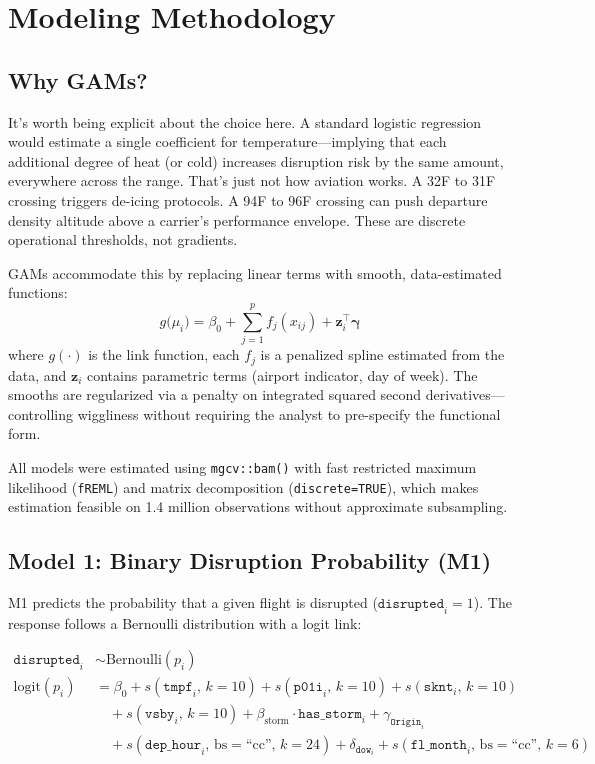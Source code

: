 \documentclass[12pt, a4paper]{article}
\begin{document}
\section{Modeling Methodology}
\label{sec:methods}

\subsection{Why GAMs?}

It's worth being explicit about the choice here. A standard logistic regression would estimate a single coefficient for temperature---implying that each additional degree of heat (or cold) increases disruption risk by the same amount, everywhere across the range. That's just not how aviation works. A 32\textdegree F to 31\textdegree F crossing triggers de-icing protocols. A 94\textdegree F to 96\textdegree F crossing can push departure density altitude above a carrier's performance envelope. These are discrete operational thresholds, not gradients.

GAMs accommodate this by replacing linear terms with smooth, data-estimated functions:
\begin{equation}
    g\bigl(\mu_i\bigr) = \beta_0 + \sum_{j=1}^{p} f_j(x_{ij}) + \mathbf{z}_i^\top \boldsymbol{\gamma}
    \label{eq:gam}
\end{equation}
where $g(\cdot)$ is the link function, each $f_j$ is a penalized spline estimated from the data, and $\mathbf{z}_i$ contains parametric terms (airport indicator, day of week). The smooths are regularized via a penalty on integrated squared second derivatives---controlling wiggliness without requiring the analyst to pre-specify the functional form.

All models were estimated using \texttt{mgcv::bam()} \citep{wood2017} with fast restricted maximum likelihood (\texttt{fREML}) and matrix decomposition (\texttt{discrete=TRUE}), which makes estimation feasible on 1.4 million observations without approximate subsampling.

\subsection{Model 1: Binary Disruption Probability (M1)}

M1 predicts the probability that a given flight is disrupted ($\texttt{disrupted}_i = 1$). The response follows a Bernoulli distribution with a logit link:

\begin{align}
    \texttt{disrupted}_i &\sim \text{Bernoulli}(p_i) \nonumber \\
    \text{logit}(p_i) &= \beta_0 + s(\texttt{tmpf}_i,\, k=10) + s(\texttt{p01i}_i,\, k=10) + s(\texttt{sknt}_i,\, k=10) \nonumber \\
    &\quad + s(\texttt{vsby}_i,\, k=10) + \beta_{\text{storm}} \cdot \texttt{has\_storm}_i + \gamma_{\texttt{Origin}_i} \nonumber \\
    &\quad + s(\texttt{dep\_hour}_i,\, \text{bs}=\text{``cc''},\, k=24) + \delta_{\texttt{dow}_i} + s(\texttt{fl\_month}_i,\, \text{bs}=\text{``cc''},\, k=6)
    \label{eq:m1}
\end{align}
\end{document}
